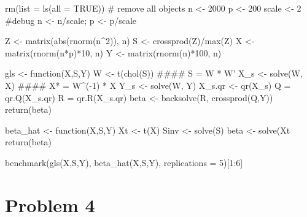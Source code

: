 \documentclass{article}
\begin{document}
rm(list = ls(all = TRUE)) # remove all objects
n <- 2000
p <- 200
scale <- 2 #debug
n <- n/scale; p <- p/scale

Z <- matrix(abs(rnorm(n^2)), n)
S <- crossprod(Z)/max(Z)
X <- matrix(rnorm(n*p)*10, n)
Y <- matrix(rnorm(n)*100, n)

gls <- function(X,S,Y){
	W <- t(chol(S)) #### S = W * W'
	X_s <- solve(W, X) #### X* = W^(-1) * X
	Y_s <- solve(W, Y)
	X_s.qr <- qr(X_s)
	Q = qr.Q(X_s.qr)
	R = qr.R(X_s.qr)
	beta <- backsolve(R, crossprod(Q,Y))	
	return(beta)
}

beta_hat <- function(X,S,Y){
	Xt <- t(X)
	Sinv <- solve(S)
	beta <- solve(Xt %
	return(beta)
}

benchmark(gls(X,S,Y), beta_hat(X,S,Y), replications = 5)[1:6]

\newpage
\section*{Problem 4}
\end{document}
